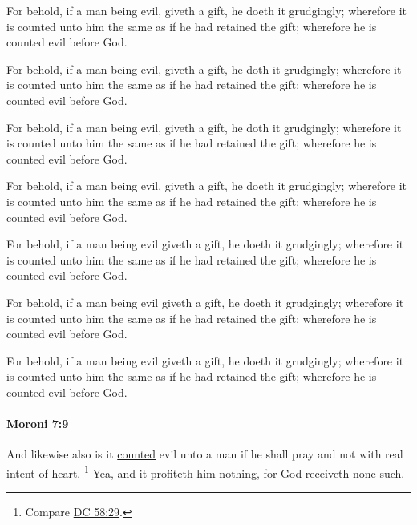			\begin{framed}
				\scriptsize
				\begin{compactdesc}
					\item[OM] [\textit{missing}]
					\item[PM] 
					\item[1830] For behold, if a man being evil, giveth a gift, he doeth it grudgingly; wherefore it is counted unto him the same as if he had retained the gift; wherefore he is counted evil before God. 
					\item[1837] For behold, if a man being evil, giveth a gift, he doth it grudgingly; wherefore it is counted unto him the same as if he had retained the gift; wherefore he is counted evil before God.
					\item[1840] For behold, if a man being evil, giveth a gift, he doth it grudgingly; wherefore it is counted unto him the same as if he had retained the gift; wherefore he is counted evil before God.
					\item[1879] For behold, if a man being evil, giveth a gift, he doeth it grudgingly; wherefore it is counted unto him the same as if he had retained the gift; wherefore he is counted evil before God.
					\item[1920] For behold, if a man being evil giveth a gift, he doeth it grudgingly; wherefore it is counted unto him the same as if he had retained the gift; wherefore he is counted evil before God.
					\item[1981] For behold, if a man being evil giveth a gift, he doeth it grudgingly; wherefore it is counted unto him the same as if he had retained the gift; wherefore he is counted evil before God.
					\item[ABM] For behold, if a man being evil giveth a gift, he doeth it grudgingly; wherefore it is counted unto him the same as if he had retained the gift; wherefore he is counted evil before God.
				\end{compactdesc}
			\end{framed}
			
		\paragraph{Moroni 7:9}
			\label{MORONI-7-9}
			
			And likewise also is it \hyperref[COUNT]{counted} evil unto a man
			if he shall pray and not with real intent of \hyperref[HEART]{heart}.%
				\footnote{%
					Compare \hyperref[DC58-29]{DC 58:29}.
					}
			Yea, and it profiteth him nothing,
			for God receiveth none such.
			
